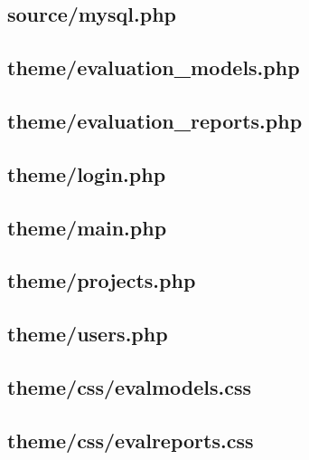 \documentclass[12pt,a4paper,titlepage,spanish,twoside]{book}
\begin{document}
\subsection{source/mysql.php}


\subsection{theme/evaluation\_models.php}


\subsection{theme/evaluation\_reports.php}


\subsection{theme/login.php}


\subsection{theme/main.php}


\subsection{theme/projects.php}


\subsection{theme/users.php}


\subsection{theme/css/evalmodels.css}


\subsection{theme/css/evalreports.css}

\end{document}
